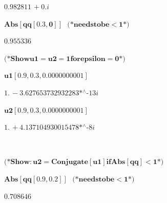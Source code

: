 {\begin{doublespace}
\noindent\(0.982811\, +0. i\)
\end{doublespace}

\begin{doublespace}
\noindent\(\pmb{\text{Abs}[\text{qq}[0.3,0]]\text{    }\text{(*} \text{needs} \text{to} \text{be} <1 \text{*)}}\)
\end{doublespace}

\begin{doublespace}
\noindent\(0.955336\)
\end{doublespace}

\begin{doublespace}
\noindent\(\pmb{\text{(*} \text{Show} \text{u1}=\text{u2}=1 \text{for} \text{epsilon}=0 \text{*)}}\)
\end{doublespace}

\begin{doublespace}
\noindent\(\pmb{\text{u1}[0.9,0.3,0.0000000001]}\)
\end{doublespace}

\begin{doublespace}
\noindent\(1.\, -\text{3.627653732932283$\grave{ }$*${}^{\wedge}$-13} i\)
\end{doublespace}

\begin{doublespace}
\noindent\(\pmb{\text{u2}[0.9,0.3,0.0000000001]}\)
\end{doublespace}

\begin{doublespace}
\noindent\(1.\, +\text{4.137104930015478$\grave{ }$*${}^{\wedge}$-8} i\)
\end{doublespace}

\begin{doublespace}
\noindent\(\pmb{\text{}}\)
\end{doublespace}

\begin{doublespace}
\noindent\(\pmb{\text{(*} \text{Show}: \text{u2} = \text{Conjugate}[\text{u1}] \text{if} \text{Abs}[\text{qq}]<1 \text{*)}}\)
\end{doublespace}

\begin{doublespace}
\noindent\(\pmb{\text{Abs}[\text{qq}[0.9,0.2]]\text{    }\text{(*} \text{needs} \text{to} \text{be} <1 \text{*)}}\)
\end{doublespace}

\begin{doublespace}
\noindent\(0.708646\)
\end{doublespace}

}
